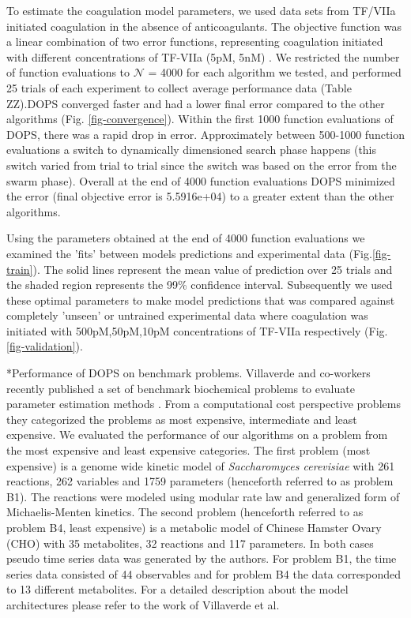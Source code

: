 \documentclass[12pt]{article}
\makeatletter
\renewcommand\subsection{\@startsection
	{subsection}{2}{0mm}
	{-0.05in}
	{-0.5\baselineskip}
	{\normalfont\normalsize\bfseries}}
\makeatother
\begin{document}
To estimate the coagulation model parameters, we used data sets from TF/VIIa initiated coagulation in the absence of anticoagulants.
The objective function was a linear combination of two error functions, representing coagulation initiated with different concentrations of TF-VIIa (5pM, 5nM) \cite{hockin2002model}.
We restricted the number of function evaluations to $\mathcal{N}$ = 4000 for each algorithm we tested, and performed 25 trials of each experiment to collect average performance data (Table ZZ).DOPS converged faster and had a lower final error compared to the other algorithms (Fig. \ref{fig-convergence}).
Within the first 1000 function evaluations of DOPS, there was a rapid drop in error.
Approximately between 500-1000 function evaluations a switch to dynamically dimensioned search phase happens (this switch varied from trial to trial since the switch was based on the error from the swarm phase). Overall at the end of 4000 function evaluations DOPS minimized the error (final objective error is 5.5916e+04) to a greater extent than the other algorithms.

Using the parameters obtained at the end of 4000 function evaluations we examined the 'fits' between models predictions and experimental data (Fig.\ref{fig-train}).
The solid lines represent the mean value of prediction over 25 trials and the shaded region represents the 99\% confidence interval.
Subsequently we used these optimal parameters to make model predictions that was compared against completely 'unseen' or untrained experimental data where
coagulation was initiated with 500pM,50pM,10pM concentrations of TF-VIIa respectively (Fig.\ref{fig-validation}).


\subsection*{Performance of DOPS on benchmark problems.}
Villaverde and co-workers recently published a set of benchmark biochemical problems to evaluate parameter estimation methods \cite{villaverde2015biopredyn}. From a computational cost perspective problems they categorized the problems as most expensive, intermediate and least expensive. We evaluated the performance of our algorithms on a problem from the most expensive and least expensive categories. The first problem (most expensive) is a genome wide kinetic model of \textit{Saccharomyces cerevisiae} with 261 reactions, 262 variables and 1759 parameters (henceforth referred to as problem B1). The reactions were modeled using modular rate law and generalized form of Michaelis-Menten kinetics.  The second problem (henceforth referred to as problem B4, least expensive) is a metabolic model of Chinese Hamster Ovary (CHO) with 35 metabolites, 32 reactions and 117 parameters. In both cases pseudo time series data was generated by the authors.  For problem B1, the time series data consisted of 44 observables and for problem B4 the data corresponded to 13 different metabolites. For a detailed description about the model architectures please refer to the work of Villaverde et al. \cite{villaverde2015biopredyn}
\end{document}
